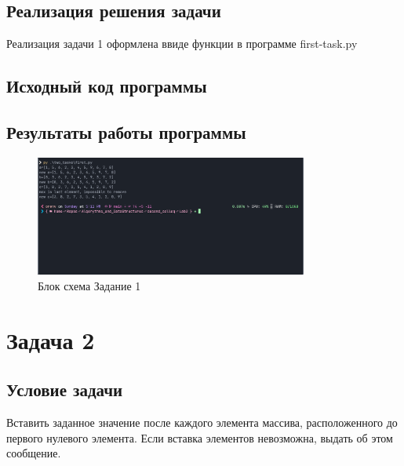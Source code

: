 \subsection{Реализация решения задачи}

Реализация задачи 1 оформлена ввиде функции в программе first-task.py


\subsection{Исходный код программы}



\subsection{Результаты работы программы}

\begin{figure}[H]
    \centering
    \includegraphics[width=0.8\textwidth]{./flowcharts/first_task.png}
    \caption{Блок схема Задание 1}
\end{figure}























\section{Задача 2}


\subsection{Условие задачи}

Вставить заданное значение после каждого элемента массива, расположенного до первого нулевого элемента. Если вставка элементов невозможна, выдать об этом сообщение.

